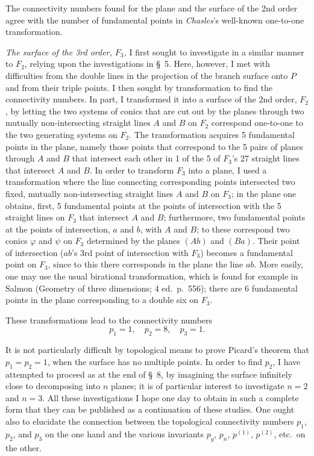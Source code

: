 \documentclass{article}
\begin{document}
The connectivity numbers found for the plane and the surface of the 2nd order agree with the number of fundamental points in \emph{Chasles}'s well-known one-to-one transformation.

\emph{The surface of the 3rd order, $F_3$,} I first sought to investigate in a similar manner to $F_2$, relying upon the investigations in \S~5. Here, however, I met with difficulties from the double lines in the projection of the branch surface onto $P$ and from their triple points. I then sought by transformation to find the connectivity numbers. In part, I transformed it into a surface of the 2nd order, $F_2$, by letting the two systems of conics that are cut out by the planes through two mutually non-intersecting straight lines $A$ and $B$ on $F_2$ correspond one-to-one to the two generating systems on $F_2$. The transformation acquires 5 fundamental points in the plane, namely those points that correspond to the 5 pairs of planes through $A$ and $B$ that intersect each other in 1 of the 5 of $F_3$'s 27 straight lines that intersect $A$ and $B$. In order to transform $F_3$ into a plane, I used a transformation where the line connecting corresponding points intersected two fixed, mutually non-intersecting straight lines $A$ and $B$ on $F_3$; in the plane one obtains, first, 5 fundamental points at the points of intersection with the 5 straight lines on $F_3$ that intersect $A$ and $B$; furthermore, two fundamental points at the points of intersection, $a$ and $b$, with $A$ and $B$; to these correspond two conics $\varphi$ and $\psi$ on $F_3$ determined by the planes $(Ab)$ and $(Ba)$. Their point of intersection ($ab$'s 3rd point of intersection with $F_3$) becomes a fundamental point on $F_3$, since to this there corresponds in the plane the line $ab$. More easily, one may use the usual birational transformation, which is found for example in Salmon (Geometry of three dimensions; 4 ed.\ p.\ 556); there are 6 fundamental points in the plane corresponding to a double six on $F_3$.

These transformations lead to the connectivity numbers
\[
p_1 = 1, \quad p_2 = 8, \quad p_3 = 1.
\]

It is not particularly difficult by topological means to prove Picard's theorem that $p_1 = p_2 = 1$, when the surface has no multiple points. In order to find $p_2$, I have attempted to proceed as at the end of \S~8, by imagining the surface infinitely close to decomposing into $n$ planes; it is of particular interest to investigate $n = 2$ and $n = 3$. All these investigations I hope one day to obtain in such a complete form that they can be published as a continuation of these studies. One ought also to elucidate the connection between the topological connectivity numbers $p_1$, $p_2$, and $p_3$ on the one hand and the various invariants $p_g$, $p_n$, $p^{(1)}$, $p^{(2)}$, etc.\ on the other.
\end{document}
